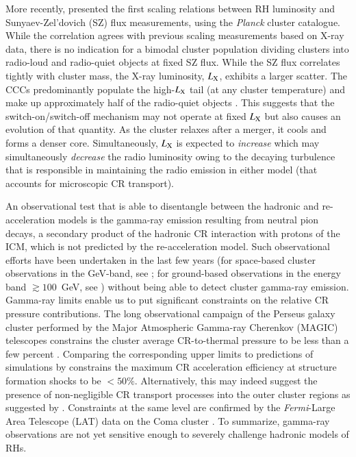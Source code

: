 \documentclass[useAMS,usenatbib]{mn2e}
\begin{document}
More recently, \cite{2012MNRAS.421L.112B} presented the first scaling relations
between RH luminosity and Sunyaev-Zel'dovich (SZ) flux measurements, using the
\emph{Planck} cluster catalogue. While the correlation agrees with previous
scaling measurements based on X-ray data, there is no indication for a bimodal
cluster population dividing clusters into radio-loud and radio-quiet objects at
fixed SZ flux. While the SZ flux correlates tightly with cluster mass, the X-ray
luminosity, $L_{\mathrm{X}}$, exhibits a larger scatter. The CCCs predominantly
populate the high-$L_{\mathrm{X}}$ tail (at any cluster temperature) and make up
approximately half of the radio-quiet objects \citep{2011A&A...527A..99E}. This
suggests that the switch-on/switch-off mechanism may not operate at fixed
$L_{\mathrm{X}}$ but also causes an evolution of that quantity. As the cluster
relaxes after a merger, it cools and forms a denser core. Simultaneously,
$L_{\mathrm{X}}$ is expected to {\em increase} which may simultaneously {\em
  decrease} the radio luminosity owing to the decaying turbulence that is
responsible in maintaining the radio emission in either model (that accounts for
microscopic CR transport).
 
An observational test that is able to disentangle between the hadronic and
re-acceleration models is the gamma-ray emission resulting from neutral pion
decays, a secondary product of the hadronic CR interaction with protons of the
ICM, which is not predicted by the re-acceleration model. Such observational
efforts have been undertaken in the last few years (for space-based cluster
observations in the GeV-band, see \citealt{2003ApJ...588..155R,
  2010JCAP...05..025A,2010ApJ...717L..71A,2012AAS...21920701Z,2012arXiv1207.6749H}; for ground-based
observations in the energy band $\gtrsim100$~GeV, see
\citealt{2006ApJ...644..148P, 2008AIPC.1085..569P,
  2009arXiv0907.0727T,2009A&A...495...27A, 2009arXiv0907.3001D,
  2009arXiv0907.5000G, cangaroo_clusters, 2009ApJ...706L.275A,
  2010ApJ...710..634A, 2011arXiv1111.5544M,2012...VERITAS,2012A&A...545A.103H})
without being able to detect cluster gamma-ray emission.  Gamma-ray limits
enable us to put significant constraints on the relative CR pressure
contributions. The long observational campaign of the Perseus galaxy cluster
performed by the Major Atmospheric Gamma-ray Cherenkov (MAGIC) telescopes
constrains the cluster average CR-to-thermal pressure to be less than a few
percent \citep{2010ApJ...710..634A,2011arXiv1111.5544M}. Comparing the
corresponding upper limits to predictions of simulations by
\cite{2010MNRAS.409..449P} constrains the maximum CR acceleration efficiency at
structure formation shocks to be $<50\%$.  Alternatively, this may indeed
suggest the presence of non-negligible CR transport processes into the outer
cluster regions as suggested by \cite{2011A&A...527A..99E}.  Constraints at the
same level are confirmed by the \emph{Fermi}-Large Area Telescope (LAT) data on
the Coma cluster \citep{2011arXiv1105.3240P,2012AAS...21920701Z,
  2012...VERITAS,2012arXiv1207.6749H}. To summarize, gamma-ray observations are not yet sensitive
enough to severely challenge hadronic models of RHs.
\end{document}
